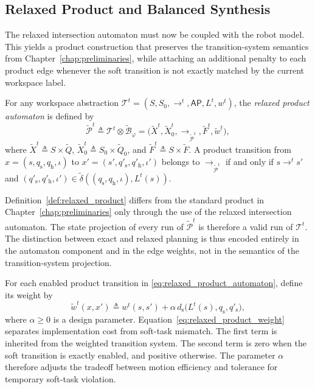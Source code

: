 \subsection{Relaxed Product and Balanced Synthesis}
\label{subsec:relaxed_product_balanced}

The relaxed intersection automaton must now be coupled with the robot model.
This yields a product construction that preserves the transition-system
semantics from Chapter~\ref{chap:preliminaries}, while attaching an additional
penalty to each product edge whenever the soft transition is not exactly matched
by the current workspace label.

\begin{definition}
\label{def:relaxed_product}
For any workspace abstraction
$\mathcal{T}^{t}=(S,S_{0},\rightarrow^{t},\mathsf{AP},L^{t},w^{t})$, the
\emph{relaxed product automaton} is defined by
\begin{equation}
\widetilde{\mathcal{P}}^{t} \triangleq
\mathcal{T}^{t} \otimes \widetilde{\mathcal{B}}_{\varphi}
=
\bigl(\widetilde{X}^{t},\widetilde{X}_{0}^{t},
\rightarrow_{\widetilde{\mathcal{P}}^{t}},
\widetilde{F}^{t},\widetilde{w}^{t}\bigr),
\label{eq:relaxed_product_automaton}
\end{equation}
where
$\widetilde{X}^{t} \triangleq S \times \widetilde{Q}$,
$\widetilde{X}_{0}^{t} \triangleq S_{0} \times \widetilde{Q}_{0}$, and
$\widetilde{F}^{t} \triangleq S \times \widetilde{F}$.
A product transition from
$x=(s,q_{\mathrm{s}},q_{\mathrm{h}},\iota)$ to
$x'=(s',q'_{\mathrm{s}},q'_{\mathrm{h}},\iota')$ belongs to
$\rightarrow_{\widetilde{\mathcal{P}}^{t}}$ if and only if
$s \rightarrow^{t} s'$ and
$(q'_{\mathrm{s}},q'_{\mathrm{h}},\iota')
\in \widetilde{\delta}((q_{\mathrm{s}},q_{\mathrm{h}},\iota),L^{t}(s))$.
\end{definition}

Definition~\ref{def:relaxed_product} differs from the standard product in
Chapter~\ref{chap:preliminaries} only through the use of the relaxed
intersection automaton. The state projection of every run of
$\widetilde{\mathcal{P}}^{t}$ is therefore a valid run of $\mathcal{T}^{t}$.
The distinction between exact and relaxed planning is thus encoded entirely in
the automaton component and in the edge weights, not in the semantics of the
transition-system projection.

For each enabled product transition in
\eqref{eq:relaxed_product_automaton}, define its weight by
\begin{equation}
\widetilde{w}^{t}(x,x') \triangleq
w^{t}(s,s') + \alpha \,
 d_{\mathrm{s}}\bigl(L^{t}(s),q_{\mathrm{s}},q'_{\mathrm{s}}\bigr),
\label{eq:relaxed_product_weight}
\end{equation}
where $\alpha \geq 0$ is a design parameter.
Equation~\eqref{eq:relaxed_product_weight} separates implementation cost from
soft-task mismatch. The first term is inherited from the weighted transition
system. The second term is zero when the soft transition is exactly enabled, and
positive otherwise. The parameter $\alpha$ therefore adjusts the tradeoff
between motion efficiency and tolerance for temporary soft-task violation.

